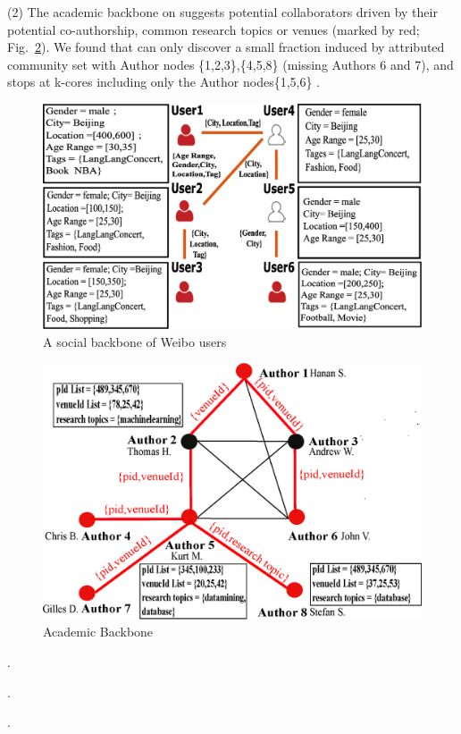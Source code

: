 \stab
(2) The academic backbone on \cita
suggests potential collaborators driven by their
potential co-authorship,
common research topics or
venues (marked by red; Fig.~\ref{fig-case-2}). We found that
\cesna {} can only discover
a small fraction induced by
attributed community set
with Author nodes \{1,2,3\},\{4,5,8\} (missing Authors 6 and 7),
and \kcore stops at
k-cores including only
the Author nodes\{1,5,6\} .

\begin{figure}[tb!]
\centering
\centerline{\includegraphics[scale=0.18]{./fig/UseCase1_v3.eps}}%
\caption{A social backbone of Weibo users
}
\label{fig-case-1}
\end{figure}

\begin{figure}[tb!]
\centering
\centerline{\includegraphics[scale=0.41]{./fig/UseCase2_v3.eps}}%
\caption{Academic  Backbone
}
\label{fig-case-2}
\end{figure}

.

.

.